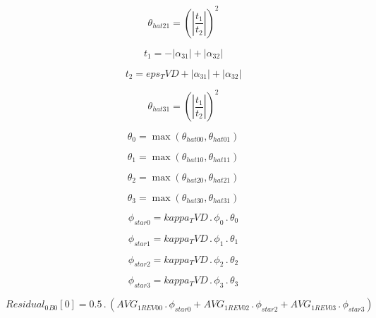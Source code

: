 \documentclass{article}
\begin{document}
\begin{dmath}\theta_{hat 21} = \left(\left|{\frac{t_{1}}{t_{2}}}\right| \right)^{2}\end{dmath}

\begin{dmath}t_{1} = - \left|{\alpha_{31}}\right| + \left|{\alpha_{32}}\right|\end{dmath}

\begin{dmath}t_{2} = eps_TVD + \left|{\alpha_{31}}\right| + \left|{\alpha_{32}}\right|\end{dmath}

\begin{dmath}\theta_{hat 31} = \left(\left|{\frac{t_{1}}{t_{2}}}\right| \right)^{2}\end{dmath}

\begin{dmath}\theta_{0} = \max\left(\theta_{hat 00}, \theta_{hat 01}\right)\end{dmath}

\begin{dmath}\theta_{1} = \max\left(\theta_{hat 10}, \theta_{hat 11}\right)\end{dmath}

\begin{dmath}\theta_{2} = \max\left(\theta_{hat 20}, \theta_{hat 21}\right)\end{dmath}

\begin{dmath}\theta_{3} = \max\left(\theta_{hat 30}, \theta_{hat 31}\right)\end{dmath}

\begin{dmath}\phi_{star 0} = kappa_TVD \,.\, \phi_{0} \,.\, \theta_{0}\end{dmath}

\begin{dmath}\phi_{star 1} = kappa_TVD \,.\, \phi_{1} \,.\, \theta_{1}\end{dmath}

\begin{dmath}\phi_{star 2} = kappa_TVD \,.\, \phi_{2} \,.\, \theta_{2}\end{dmath}

\begin{dmath}\phi_{star 3} = kappa_TVD \,.\, \phi_{3} \,.\, \theta_{3}\end{dmath}

\begin{dmath}{Residual_{0}{_{B0}}}[{0}] = 0.5 \,.\, \left(AVG_{1 REV 00} \,.\, \phi_{star 0} + AVG_{1 REV 02} \,.\, \phi_{star 2} + AVG_{1 REV 03} \,.\, \phi_{star 3}\right)\end{dmath}
\end{document}
